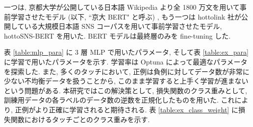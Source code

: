 \newpage

一つは, 京都大学が公開している日本語 Wikipedia より全 1800 万文を用いて事前学習させたモデル \cite{kyoto-bert} (以下, ``京大 BERT" と呼ぶ) , もう一つは hottolink 社が公開している大規模日本語 SNS コーパスを用いて事前学習させたモデル, hottoSNS-BERT \cite{hottoSNS-bert} を用いた. BERT モデルは最終層のみを fine-tuning した.

表 \ref{table:mlp_para} に 3 層 MLP で用いたパラメータ, そして表 \ref{table:ex_para} に学習で用いたパラメータを示す. 学習率は Optuna \cite{optuna_2019} によって最適なパラメータを探索した.
また, 多くのタッチにおいて, 正例は負例に対してデータ数が非常に少ない不均衡データを扱うことから, このまま学習すると上手く学習が進まないという問題がある. 本研究ではこの解決策として, 損失関数のクラス重みとして, 訓練用データの各ラベルのデータ数の逆数を正規化したものを用いた. これにより, 正例がより正確に学習されると期待される. 表 \ref{table:ex_class_weight} に損失関数におけるタッチごとのクラス重みを示す.

\begin{table}[!h]
\vspace{20mm}
\caption{各実験における MLP のパラメータ}
\label{table:mlp_para}
\centering
{}
\end{table}

\newpage

\begin{table}[!h]
\vspace{10mm}
\caption{学習パラメータ}
\label{table:ex_para}
\centering
{}
\vspace{10mm}
\end{table}

